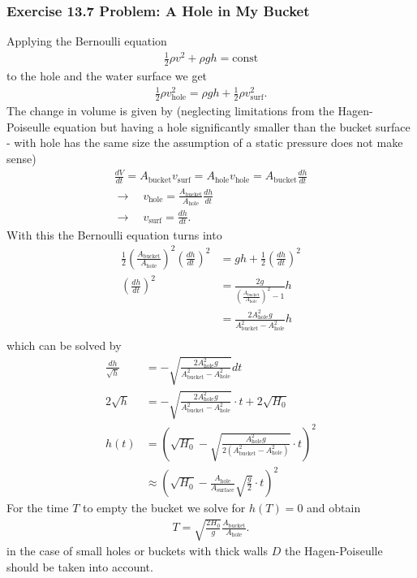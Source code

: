 \documentclass[10pt,a4paper]{book}
\theoremstyle{definition}
\begin{document}
\subsubsection{Exercise 13.7 Problem: A Hole in My Bucket}
Applying the Bernoulli equation 
\begin{align}
    \frac{1}{2}\rho v^2 + \rho g h = \text{const}
\end{align}
to the hole and the water surface we get
\begin{align}
    \frac{1}{2}\rho v_\text{hole}^2 = \rho g h + \frac{1}{2}\rho v_\text{surf}^2.
\end{align}
The change in volume is given by (neglecting limitations from the Hagen-Poiseulle equation but having a hole significantly smaller than the bucket surface - with hole has the same size the assumption of a static pressure does not make sense)
\begin{align}
    \frac{dV}{dt}=A_\text{bucket}v_\text{surf}=A_\text{hole}v_\text{hole}=A_\text{bucket}\frac{dh}{dt}\\
    \rightarrow\quad v_\text{hole}=\frac{A_\text{bucket}}{A_\text{hole}}\frac{dh}{dt}\\
    \rightarrow\quad v_\text{surf}=\frac{dh}{dt}.
\end{align}
With this the Bernoulli equation turns into
\begin{align}
    \frac{1}{2}\left(\frac{A_\text{bucket}}{A_\text{hole}}\right)^2\left(\frac{dh}{dt}\right)^2&=gh+\frac{1}{2}\left(\frac{dh}{dt}\right)^2\\
    \left(\frac{dh}{dt}\right)^2&=\frac{2g}{\left(\frac{A_\text{bucket}}{A_\text{hole}}\right)^2-1}h\\
    &=\frac{2A_\text{hole}^2g}{A_\text{bucket}^2-A_\text{hole}^2}h\\
\end{align}
which can be solved by
\begin{align}
    \frac{dh}{\sqrt{h}}&=-\sqrt{\frac{2A_\text{hole}^2g}{A_\text{bucket}^2-A_\text{hole}^2}}dt\\
    2\sqrt{h}&=-\sqrt{\frac{2A_\text{hole}^2g}{A_\text{bucket}^2-A_\text{hole}^2}}\cdot t+2\sqrt{H_0}\\
    h(t)&=\left(\sqrt{H_0}-\sqrt{\frac{A_\text{hole}^2g}{2(A_\text{bucket}^2-A_\text{hole}^2)}}\cdot t\right)^2\\
    &\approx\left(\sqrt{H_0}-\frac{A_\text{hole}}{A_\text{surface}}\sqrt{\frac{g}{2}}\cdot t\right)^2
\end{align}
For the time $T$ to empty the bucket we solve for $h(T)=0$ and obtain
\begin{align}
    T = \sqrt{\frac{2H_0}{g}}\frac{A_\text{bucket}}{A_\text{hole}}.
\end{align}
in the case of small holes or buckets with thick walls $D$ the Hagen-Poiseulle should be taken into account.
\end{document}
